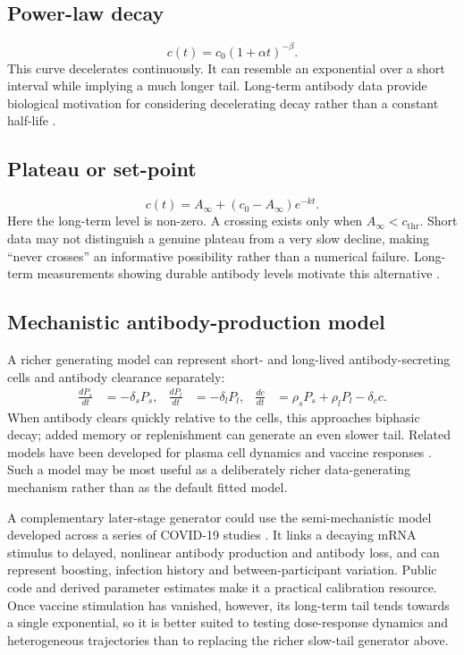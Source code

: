 \documentclass[11pt,a4paper]{article}
\begin{document}
\subsection*{Power-law decay}
\begin{equation}
  c(t)=c_0(1+\alpha t)^{-\beta}.
\end{equation}
This curve decelerates continuously. It can resemble an exponential over a short interval while
implying a much longer tail. Long-term antibody data provide biological motivation for considering
decelerating decay rather than a constant half-life \parencite{amanna2007}.

\subsection*{Plateau or set-point}
\begin{equation}
  c(t)=A_\infty +(c_0-A_\infty)e^{-kt}.
\end{equation}
Here the long-term level is non-zero. A crossing exists only when
$A_\infty<c_{\mathrm{thr}}$. Short data may not distinguish a genuine plateau from a very slow
decline, making ``never crosses'' an informative possibility rather than a numerical failure.
Long-term measurements showing durable antibody levels motivate this alternative
\parencite{amanna2007}.

\subsection*{Mechanistic antibody-production model}
A richer generating model can represent short- and long-lived antibody-secreting cells and
antibody clearance separately:
\begin{align}
  \frac{dP_s}{dt}&=-\delta_sP_s, &
  \frac{dP_l}{dt}&=-\delta_lP_l, &
  \frac{dc}{dt}&=\rho_sP_s+\rho_lP_l-\delta_cc.
\end{align}
When antibody clears quickly relative to the cells, this approaches biphasic decay; added memory
or replenishment can generate an even slower tail. Related models have been developed for plasma
cell dynamics and vaccine responses \parencite{andraud2012,pasin2019}. Such a model may be most
useful as a deliberately richer data-generating mechanism rather than as the default fitted model.

A complementary later-stage generator could use the semi-mechanistic model developed across a
series of COVID-19 studies \parencite{nishiyama2023,nakamura2024,park2025,hart2025}. It links a
decaying mRNA stimulus to delayed, nonlinear antibody production and antibody loss, and can
represent boosting, infection history and between-participant variation. Public code and derived
parameter estimates make it a practical calibration resource. Once vaccine stimulation has
vanished, however, its long-term tail tends towards a single exponential, so it is better suited to
testing dose-response dynamics and heterogeneous trajectories than to replacing the richer
slow-tail generator above.
\end{document}
